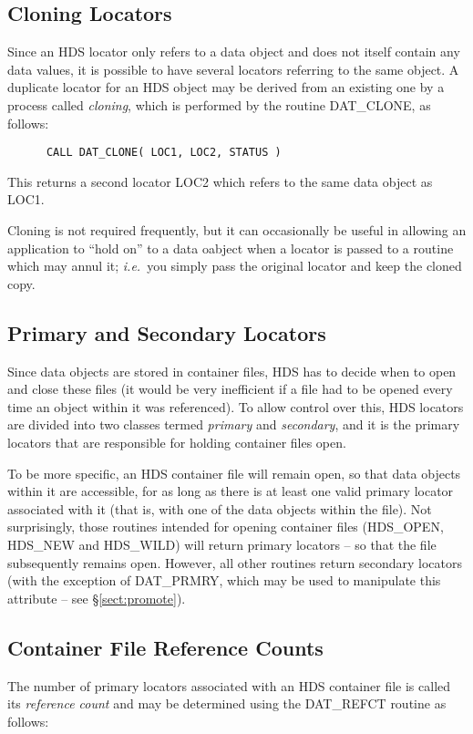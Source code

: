\subsection{Cloning Locators}

Since an HDS locator only refers to a data object and does not itself contain
any data values, it is possible to have several locators referring to the same
object.  A duplicate locator for an HDS object may be derived from an existing
one by a process called {\em cloning}, which is performed by the routine
DAT\_CLONE, as follows:

\small
\begin{verbatim}
      CALL DAT_CLONE( LOC1, LOC2, STATUS )
\end{verbatim}
\normalsize

This returns a second locator LOC2 which refers to the same data object as LOC1.

Cloning is not required frequently, but it can occasionally be useful in
allowing an application to ``hold on'' to a data oabject when a locator is
passed to a routine which may annul it; {\em i.e.}\ you simply pass the original
locator and keep the cloned copy.

\subsection{Primary and Secondary Locators}
\label{sect:primary}

Since data objects are stored in container files, HDS has to decide when to open
and close these files (it would be very inefficient if a file had to be opened
every time an object within it was referenced). To allow control over this, HDS
locators are divided into two classes termed {\em primary} and {\em secondary},
and it is the primary locators that are responsible for holding container files
open.

To be more specific, an HDS container file will remain open, so that data
objects within it are accessible, for as long as there is at least one valid
primary locator associated with it (that is, with one of the data objects within
the file). Not surprisingly, those routines intended for opening container files
(HDS\_OPEN, HDS\_NEW and HDS\_WILD) will return primary locators -- so that the
file subsequently remains open. However, all other routines return secondary
locators (with the exception of DAT\_PRMRY, which may be used to manipulate this
attribute -- see \S\ref{sect:promote}).

\subsection{Container File Reference Counts}
The number of primary locators associated with an HDS container file is called
its {\em reference count} and may be determined using the DAT\_REFCT routine as
follows:

